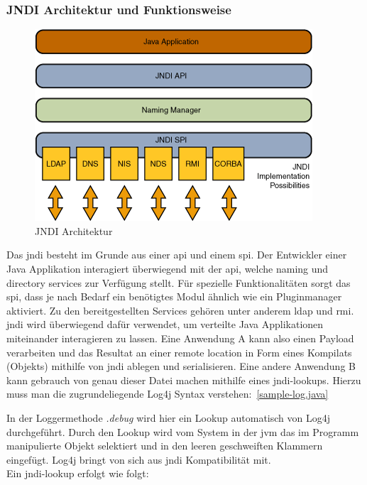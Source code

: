\subsubsection{JNDI Architektur und Funktionsweise}
\newline
\begin{figure}[!htb] %
    \begin{center}
        \includegraphics[scale=0.75]{images/jndiarch}
    \end{center}
    \caption{JNDI Architektur}
\end{figure}
\newline\newline
Das \gls{jndi} besteht im Grunde aus einer \gls{api} und einem \gls{spi}. Der Entwickler einer Java Applikation interagiert überwiegend mit der \gls{api}, welche
naming und directory services zur Verfügung stellt. Für spezielle Funktionalitäten sorgt das \gls{spi}, dass je nach Bedarf ein benötigtes Modul ähnlich wie ein Pluginmanager
aktiviert. Zu den bereitgestellten Services gehören unter anderem \gls{ldap} und \gls{rmi}. \gls{jndi} wird
überwiegend dafür verwendet, um verteilte Java Applikationen miteinander interagieren zu lassen. Eine Anwendung A kann also einen Payload verarbeiten und
das Resultat an einer remote location in Form eines Kompilats (Objekts) mithilfe von \gls{jndi} ablegen und serialisieren. Eine andere Anwendung B kann gebrauch von genau
dieser Datei machen mithilfe eines \gls{jndi}-lookups.\clearpage
Hierzu muss man die zugrundeliegende Log4j Syntax verstehen:~\ref{sample-log.java}


In der Loggermethode \textit{.debug} wird hier ein Lookup automatisch von Log4j durchgeführt. Durch den Lookup wird vom System in der \gls{jvm} das im Programm
manipulierte Objekt selektiert und in den leeren geschweiften Klammern eingefügt. Log4j bringt von sich aus \gls{jndi} Kompatibilität mit.\\

Ein \gls{jndi}-lookup erfolgt wie folgt:

